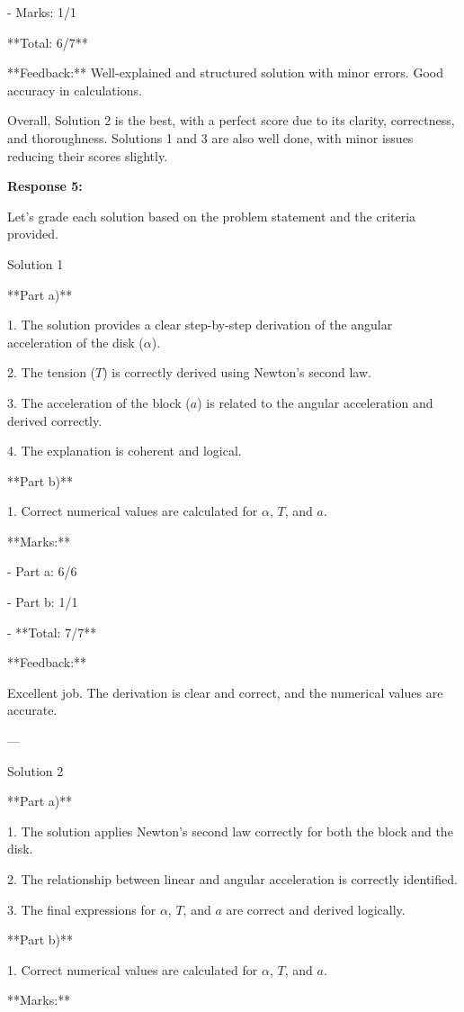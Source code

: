 \documentclass[a4paper,11pt]{article}
\begin{document}
  - Marks: 1/1

**Total: 6/7**

**Feedback:** Well-explained and structured solution with minor errors. Good accuracy in calculations.

Overall, Solution 2 is the best, with a perfect score due to its clarity, correctness, and thoroughness. Solutions 1 and 3 are also well done, with minor issues reducing their scores slightly.

\bigskip
\textbf{Response 5:}

Let's grade each solution based on the problem statement and the criteria provided.

Solution 1

**Part a)**

1. The solution provides a clear step-by-step derivation of the angular acceleration of the disk (\(\alpha\)).

2. The tension (\(T\)) is correctly derived using Newton's second law.

3. The acceleration of the block (\(a\)) is related to the angular acceleration and derived correctly.

4. The explanation is coherent and logical.

**Part b)**

1. Correct numerical values are calculated for \(\alpha\), \(T\), and \(a\).

**Marks:**

- Part a: 6/6

- Part b: 1/1

- **Total: 7/7**

**Feedback:**

Excellent job. The derivation is clear and correct, and the numerical values are accurate.

---

Solution 2

**Part a)**

1. The solution applies Newton's second law correctly for both the block and the disk.

2. The relationship between linear and angular acceleration is correctly identified.

3. The final expressions for \(\alpha\), \(T\), and \(a\) are correct and derived logically.

**Part b)**

1. Correct numerical values are calculated for \(\alpha\), \(T\), and \(a\).

**Marks:**
\end{document}
